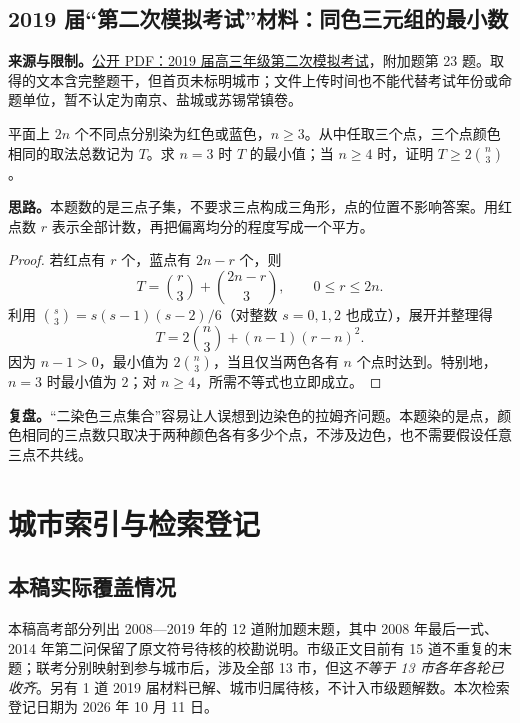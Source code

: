 \documentclass[UTF8,12pt,a4paper,fontset=fandol]{ctexart}
\begin{document}
\subsection{2019 届“第二次模拟考试”材料：同色三元组的最小数}\label{sec:u2019}
\textbf{来源与限制。}\href{https://dfiles.jiajiaoban.com/ohr/2020/03/23/120155_5e7834b332ec4.pdf}{公开 PDF：2019 届高三年级第二次模拟考试}，附加题第 23 题。取得的文本含完整题干，但首页未标明城市；文件上传时间也不能代替考试年份或命题单位，暂不认定为南京、盐城或苏锡常镇卷。
\begin{example}[题意]
平面上 $2n$ 个不同点分别染为红色或蓝色，$n\geq3$。从中任取三个点，三个点颜色相同的取法总数记为 $T$。求 $n=3$ 时 $T$ 的最小值；当 $n\geq4$ 时，证明 $T\geq2\binom n3$。
\end{example}
\textbf{思路。}本题数的是三点子集，不要求三点构成三角形，点的位置不影响答案。用红点数 $r$ 表示全部计数，再把偏离均分的程度写成一个平方。
\begin{proof}
若红点有 $r$ 个，蓝点有 $2n-r$ 个，则
\[
T=\binom r3+\binom{2n-r}3,
\qquad 0\leq r\leq2n.
\]
利用 $\binom s3=s(s-1)(s-2)/6$（对整数 $s=0,1,2$ 也成立），展开并整理得
\[
T=2\binom n3+(n-1)(r-n)^2.
\]
因为 $n-1>0$，最小值为 $2\binom n3$，当且仅当两色各有 $n$ 个点时达到。特别地，$n=3$ 时最小值为 $2$；对 $n\geq4$，所需不等式也立即成立。
\end{proof}
\textbf{复盘。}“二染色三点集合”容易让人误想到边染色的拉姆齐问题。本题染的是点，颜色相同的三点数只取决于两种颜色各有多少个点，不涉及边色，也不需要假设任意三点不共线。

\section{城市索引与检索登记}\label{sec:register}
\subsection{本稿实际覆盖情况}
本稿高考部分列出 2008—2019 年的 12 道附加题末题，其中 2008 年最后一式、2014 年第二问保留了原文符号待核的校勘说明。市级正文目前有 15 道不重复的末题；联考分别映射到参与城市后，涉及全部 13 市，但这\emph{不等于 13 市各年各轮已收齐}。另有 1 道 2019 届材料已解、城市归属待核，不计入市级题解数。本次检索登记日期为 2026 年 10 月 11 日。
\end{document}
